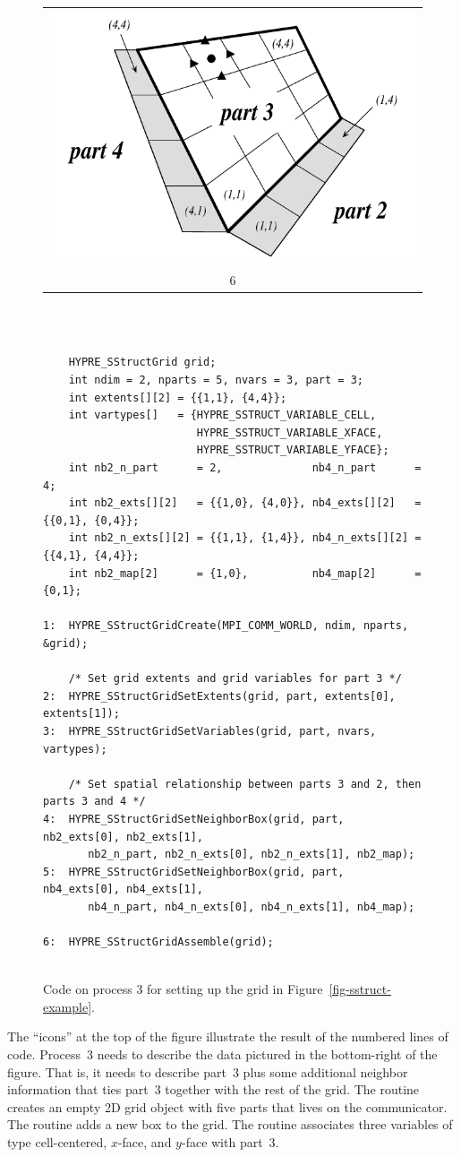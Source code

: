 \begin{figure}
\begin{tabular}{@{}c@{}}
\end{tabular}
\hfill
\begin{tabular}{@{}c@{}}
\includegraphics[width=.28\textwidth]{figSStructGrid6} \\ 6
\end{tabular}
\vspace{2em} \\
\begin{minipage}{0.9\textwidth}
\begin{verbatim}
    
    HYPRE_SStructGrid grid;
    int ndim = 2, nparts = 5, nvars = 3, part = 3;
    int extents[][2] = {{1,1}, {4,4}};
    int vartypes[]   = {HYPRE_SSTRUCT_VARIABLE_CELL,
                        HYPRE_SSTRUCT_VARIABLE_XFACE,
                        HYPRE_SSTRUCT_VARIABLE_YFACE};
    int nb2_n_part      = 2,              nb4_n_part      = 4;
    int nb2_exts[][2]   = {{1,0}, {4,0}}, nb4_exts[][2]   = {{0,1}, {0,4}};
    int nb2_n_exts[][2] = {{1,1}, {1,4}}, nb4_n_exts[][2] = {{4,1}, {4,4}};
    int nb2_map[2]      = {1,0},          nb4_map[2]      = {0,1};

1:  HYPRE_SStructGridCreate(MPI_COMM_WORLD, ndim, nparts, &grid);
    
    /* Set grid extents and grid variables for part 3 */
2:  HYPRE_SStructGridSetExtents(grid, part, extents[0], extents[1]);
3:  HYPRE_SStructGridSetVariables(grid, part, nvars, vartypes);
    
    /* Set spatial relationship between parts 3 and 2, then parts 3 and 4 */
4:  HYPRE_SStructGridSetNeighborBox(grid, part, nb2_exts[0], nb2_exts[1],
       nb2_n_part, nb2_n_exts[0], nb2_n_exts[1], nb2_map);
5:  HYPRE_SStructGridSetNeighborBox(grid, part, nb4_exts[0], nb4_exts[1],
       nb4_n_part, nb4_n_exts[0], nb4_n_exts[1], nb4_map);
    
6:  HYPRE_SStructGridAssemble(grid);
    
\end{verbatim}
\end{minipage}
\caption{%
Code on process 3 for setting up the grid in Figure~\ref{fig-sstruct-example}.}
\label{fig-sstruct-grid}
\end{figure}
The ``icons'' at the top of the figure illustrate the result of the numbered
lines of code.  Process~3 needs to describe the data pictured in the
bottom-right of the figure.  That is, it needs to describe part~3 plus some
additional neighbor information that ties part~3 together with the rest of the
grid.  The  routine creates an empty 2D grid object with five
parts that lives on the  communicator.  The
 routine adds a new box to the grid.  The
 routine associates three variables of type cell-centered,
$x$-face, and $y$-face with part~3.

